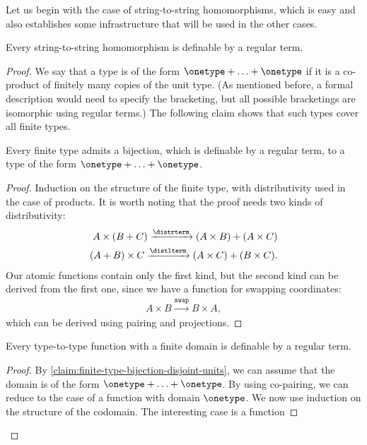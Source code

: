 Let us begin with the case of string-to-string homomorphisms, which is easy and also establishes some infrastructure that will be used in the other cases.



\begin{lemma}\label{lem:terms-define-string-homomorphisms}
        Every string-to-string homomorphism is definable by a regular term.
\end{lemma}
\begin{proof}
    We say that a type is of the form $\onetype + \ldots + \onetype$ if it is a co-product of finitely many copies of the unit type.  (As mentioned before, a formal description would need to specify the bracketing, but  all possible bracketings are isomorphic using regular terms.) The following claim shows that such types cover all finite types.
    \begin{claim}\label{claim:finite-type-bijection-disjoint-units}
        Every finite type admits a bijection, which is definable by a regular term, to a type of the form $\onetype + \ldots + \onetype$.
    \end{claim}
    \begin{proof}
        Induction on the structure of the finite type, with distributivity used in the case of products. It is worth noting that the proof needs two  kinds of distributivity:
\begin{align*}
A \times (B + C) \xrightarrow {\distrterm} (A \times B) + (A \times C)\\
(A + B) \times C \xrightarrow {\distlterm} (A \times C) + (B \times C).
\end{align*}
    Our atomic functions contain only the first kind, but the second kind can be derived from the first one, since we have a function for swapping coordinates:
\begin{align*}
A \times B \xrightarrow {\mathtt{swap}} B \times A,
\end{align*}
which can be derived using pairing and projections.
    \end{proof}
    \begin{claim}\label{claim:finite-domain-regular-list-function}
        Every type-to-type function with a finite domain  is definable by a regular term.
    \end{claim}
    \begin{proof}
        By \cref{claim:finite-type-bijection-disjoint-units}, we can assume that the domain is of the form $\onetype + \ldots + \onetype$. By using co-pairing, we can reduce to the case of a function with domain $\onetype$. We now use induction on the structure of the codomain. The interesting case is a function 

\end{proof}
\end{proof}
